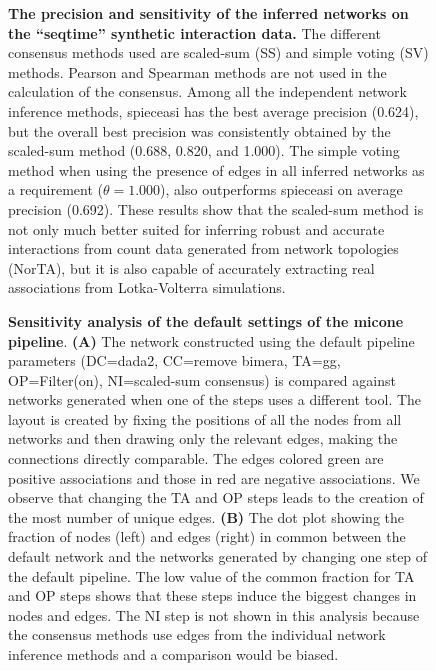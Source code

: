 \documentclass[letterpaper,12pt]{article}
\begin{document}
  \begin{figure}[H]
    \centering
      \caption{
        \textbf{The precision and sensitivity of the inferred networks on the ``seqtime'' synthetic interaction data.}
        The different consensus methods used are scaled-sum (SS) and simple voting (SV) methods.
        Pearson and Spearman methods are not used in the calculation of the consensus.
        Among all the independent network inference methods, \acs{spieceasi} has the best average precision (0.624), but the overall best precision was consistently obtained by the scaled-sum method (0.688, 0.820, and 1.000).
        The simple voting method when using the presence of edges in all inferred networks as a requirement ($\theta = 1.000$), also outperforms \acs{spieceasi} on average precision (0.692).
        These results show that the scaled-sum method is not only much better suited for inferring robust and accurate interactions from count data generated from network topologies (NorTA), but it is also capable of accurately extracting real associations from Lotka-Volterra simulations.
      }
    \label{fig:figure_s6}
  \end{figure}

  \begin{figure}[H]
    \centering
    \caption{
      \textbf{Sensitivity analysis of the default settings of the \ac{micone} pipeline}.
      \textbf{(A)} The network constructed using the default pipeline parameters (DC=\ac{dada2}, CC=remove bimera, TA=\ac{gg}, OP=Filter(on), NI=scaled-sum consensus) is compared against networks generated when one of the steps uses a different tool.
      The layout is created by fixing the positions of all the nodes from all networks and then drawing only the relevant edges, making the connections directly comparable.
      The edges colored green are positive associations and those in red are negative associations.
      We observe that changing the TA and OP steps leads to the creation of the most number of unique edges.
      \textbf{(B)} The dot plot showing the fraction of nodes (left) and edges (right) in common between the default network and the networks generated by changing one step of the default pipeline.
      The low value of the common fraction for TA and OP steps shows that these steps induce the biggest changes in nodes and edges.
      The NI step is not shown in this analysis because the consensus methods use edges from the individual network inference methods and a comparison would be biased.
    }
    \label{fig:figure_s7}
  \end{figure}
\end{document}
